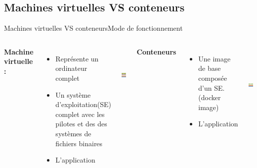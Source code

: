 \documentclass{beamer}
\begin{document}
\subsection*{Machines virtuelles VS conteneurs}
\begin{frame}{Machines virtuelles VS conteneurs}{Mode de fonctionnement}
        \begin{columns}
            \textbf{ Machine virtuelle :} 
            \begin{itemize}
                \item Représente un ordinateur complet 
                \item Un système d’exploitation(SE) complet avec les pilotes et des des systèmes de fichiers binaires
                \item L’application
            \end{itemize}
            \begin{center}
                \includegraphics[width=35mm,height=30mm]{VM.png}
            \end{center}
            \textbf{Conteneurs}
            \begin{itemize}
                \item Une image de base composée d’un SE. (docker image)
                \item L'application
            \end{itemize}
                \begin{center}
                    \includegraphics[width=35mm,height=40mm]{Conteneures.png}
                \end{center}

        \end{columns}

\end{frame}
\end{document}
